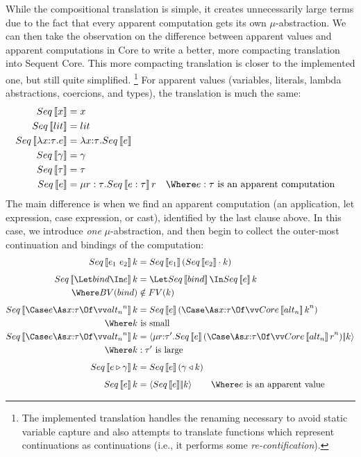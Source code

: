 \documentclass{article}
\begin{document}
While the compositional translation is simple, it creates unnecessarily large
terms due to the fact that every apparent computation gets its own
$\mu$-abstraction.  We can then take the observation on the difference between
apparent values and apparent computations in Core to write a better, more
compacting translation into Sequent Core.  This more compacting translation is
closer to the implemented one, but still quite simplified.%
\footnote{The implemented translation handles the renaming necessary to avoid
  static variable capture and also attempts to translate functions which
  represent continuations as continuations (i.e., it performs some
  \emph{re-contification}).}
For apparent values (variables, literals, lambda abstractions, coercions, and
types), the translation is much the same:
\begin{align*}
  Seq\trans{x} &= x
  \\
  Seq\trans{\lit} &= \lit
  \\
  Seq\trans{\fn{\ann{x}{\ty}} \expr}
  &=
  \fn{\ann{x}{\ty}} Seq\trans{\expr}
  \\
  Seq\trans{\cn} &= \cn
  \\
  Seq\trans{\ty} &= \ty
  \\
  Seq\trans{\expr}
  &= \comp{r:\ty} Seq\trans{\expr : \ty} r
  &
  \Where
  \expr &:\ty \text{ is an apparent computation}
\end{align*}
The main difference is when we find an apparent computation (an application, let
expression, case expression, or cast), identified by the last clause above.  In
this case, we introduce \emph{one} $\mu$-abstraction, and then begin to collect
the outer-most continuation and bindings of the computation:
\begin{align*}
  Seq\trans{\expr_1 ~ \expr_2} \ko
  &=
  Seq\trans{\expr_1} (\app{Seq\trans{\expr_2}}{\ko})
  \\[1ex]
  Seq\trans{\Let \abind \In \expr} \ko
  &=
  \Let Seq\trans{\abind} \In Seq\trans{\expr} \ko
  \\
  \Where
    BV(\abind) &\notin FV(\ko)
  \\[1ex]
  Seq\trans{\Case \expr \As \ann{x}{\ty} \Of \vect[n]{\analt_n}} \ko
  &=
  Seq\trans{\expr} (\caseas{\ann{x}{\ty}}{\vect[n]{Core\trans{\analt_n} \ko}})
  \\
  \Where
  \ko &\text{ is small }
  \\
  Seq\trans{\Case \expr \As \ann{x}{\ty} \Of \vect[n]{\analt_n}} \ko
  &=
  \cut
    {\comp{\ann{r}{\ty'}}
      Seq\trans{\expr}
      (\caseas{\ann{x}{\ty}}{\vect[n]{Core\trans{\analt_n} r}})
    }
    {\ko}
  \\
  \Where
  \ko &:\ty' \text{ is large }
  \\[1ex]
  Seq\trans{\coerce{\expr}{\cn}} \ko
  &=
  Seq\trans{\expr} (\koerce{\cn}{\ko})
  \\[1ex]
  Seq\trans{\expr} \ko
  &=
  \cut{Seq\trans{\expr}}{\ko}
  \qquad
  \Where
    \expr \text{ is an apparent value }
\end{align*}
\end{document}
